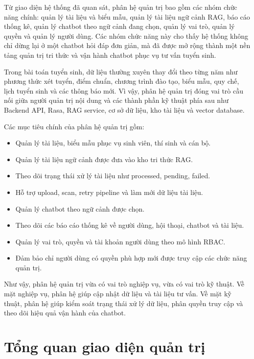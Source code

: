 \documentclass[12pt,a4paper]{report}
\begin{document}
Từ giao diện hệ thống đã quan sát, phân hệ quản trị bao gồm các nhóm chức năng chính: quản lý tài liệu và biểu mẫu, quản lý tài liệu ngữ cảnh RAG, báo cáo thống kê, quản lý chatbot theo ngữ cảnh đang chọn, quản lý vai trò, quản lý quyền và quản lý người dùng. Các nhóm chức năng này cho thấy hệ thống không chỉ dừng lại ở một chatbot hỏi đáp đơn giản, mà đã được mở rộng thành một nền tảng quản trị tri thức và vận hành chatbot phục vụ tư vấn tuyển sinh.

Trong bài toán tuyển sinh, dữ liệu thường xuyên thay đổi theo từng năm như phương thức xét tuyển, điểm chuẩn, chương trình đào tạo, biểu mẫu, quy chế, lịch tuyển sinh và các thông báo mới. Vì vậy, phân hệ quản trị đóng vai trò cầu nối giữa người quản trị nội dung và các thành phần kỹ thuật phía sau như Backend API, Rasa, RAG service, cơ sở dữ liệu, kho tài liệu và vector database.

Các mục tiêu chính của phân hệ quản trị gồm:

\begin{itemize}
    \item Quản lý tài liệu, biểu mẫu phục vụ sinh viên, thí sinh và cán bộ.
    \item Quản lý tài liệu ngữ cảnh được đưa vào kho tri thức RAG.
    \item Theo dõi trạng thái xử lý tài liệu như processed, pending, failed.
    \item Hỗ trợ upload, scan, retry pipeline và làm mới dữ liệu tài liệu.
    \item Quản lý chatbot theo ngữ cảnh được chọn.
    \item Theo dõi các báo cáo thống kê về người dùng, hội thoại, chatbot và tài liệu.
    \item Quản lý vai trò, quyền và tài khoản người dùng theo mô hình RBAC.
    \item Đảm bảo chỉ người dùng có quyền phù hợp mới được truy cập các chức năng quản trị.
\end{itemize}

Như vậy, phân hệ quản trị vừa có vai trò nghiệp vụ, vừa có vai trò kỹ thuật. Về mặt nghiệp vụ, phân hệ giúp cập nhật dữ liệu và tài liệu tư vấn. Về mặt kỹ thuật, phân hệ giúp kiểm soát trạng thái xử lý dữ liệu, phân quyền truy cập và theo dõi hiệu quả vận hành của chatbot.

\section{Tổng quan giao diện quản trị}
\end{document}
